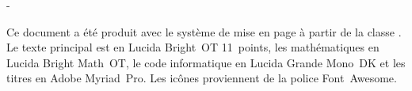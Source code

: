 \thispagestyle{empty}
\vspace*{\fill}

\begingroup
\calccentering{\unitlength}
\begin{adjustwidth*}{\unitlength}{-\unitlength}
  \begin{flushleft}
    \small %
    Ce document a été produit avec le système de mise en page
    {\XeLaTeX} à partir de la classe . Le texte
    principal est en Lucida Bright~OT 11~points, les mathématiques en
    Lucida Bright Math~OT, le code informatique en Lucida Grande
    Mono~DK et les titres en Adobe Myriad~Pro. Les icônes proviennent
    de la police Font~Awesome.
  \end{flushleft}
\end{adjustwidth*}
\endgroup
\vfill

